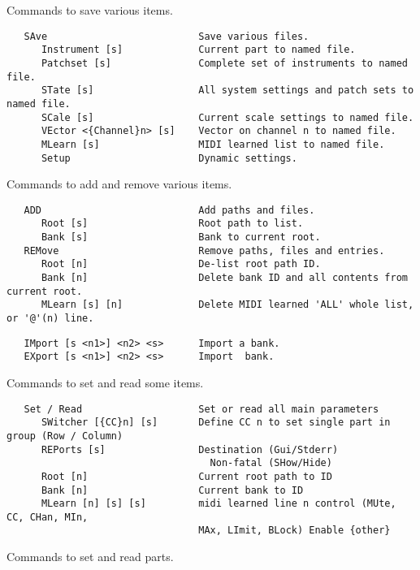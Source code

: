    Commands to save various items.

\begin{verbatim}
   SAve                          Save various files.
      Instrument [s]             Current part to named file.
      Patchset [s]               Complete set of instruments to named file.
      STate [s]                  All system settings and patch sets to named file.
      SCale [s]                  Current scale settings to named file.
      VEctor <{Channel}n> [s]    Vector on channel n to named file.
      MLearn [s]                 MIDI learned list to named file.
      Setup                      Dynamic settings.
\end{verbatim}

   Commands to add and remove various items.

\begin{verbatim}
   ADD                           Add paths and files.
      Root [s]                   Root path to list.
      Bank [s]                   Bank to current root.
   REMove                        Remove paths, files and entries.
      Root [n]                   De-list root path ID.
      Bank [n]                   Delete bank ID and all contents from current root.
      MLearn [s] [n]             Delete MIDI learned 'ALL' whole list, or '@'(n) line.
\end{verbatim}

\begin{verbatim}
   IMport [s <n1>] <n2> <s>      Import a bank.
   EXport [s <n1>] <n2> <s>      Import  bank.
\end{verbatim}

   Commands to set and read some items.

\begin{verbatim}
   Set / Read                    Set or read all main parameters
      SWitcher [{CC}n] [s]       Define CC n to set single part in group (Row / Column)
      REPorts [s]                Destination (Gui/Stderr)
                                   Non-fatal (SHow/Hide)
      Root [n]                   Current root path to ID
      Bank [n]                   Current bank to ID
      MLearn [n] [s] [s]         midi learned line n control (MUte, CC, CHan, MIn,
                                 MAx, LImit, BLock) Enable {other}
\end{verbatim}

   Commands to set and read parts.

